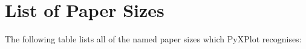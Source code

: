 %
%
%
%
%



\chapter{List of Paper Sizes}
\label{ch:paper_sizes}

The following table lists all of the named paper sizes which PyXPlot recognises:

